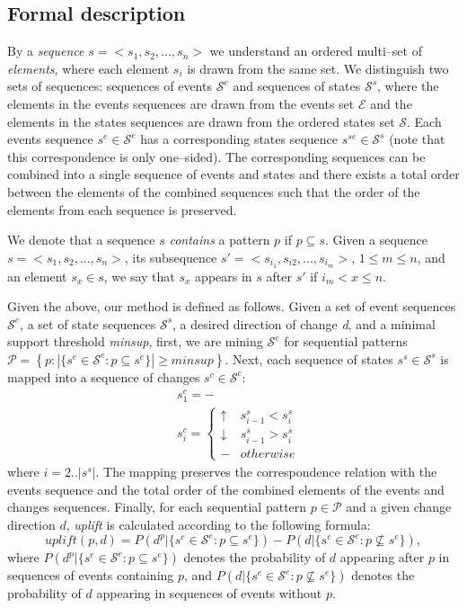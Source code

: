\documentclass[runningheads,a4paper]{llncs}
\begin{document}
\subsection{Formal description}
By a \textit{sequence} $s=<s_1, s_2, ..., s_n>$ we understand an ordered multi--set of \textit{elements}, where each element $s_i$ is drawn from the same set.
We distinguish two sets of sequences: sequences of events $\mathcal{S}^e$ and sequences of states $\mathcal{S}^s$, where the elements in the events sequences are drawn from the events set $\mathcal{E}$ and the elements in the states sequences are drawn from the ordered states set $\mathcal{S}$.
Each events sequence $s^e\in\mathcal{S}^e$ has a corresponding states sequence $s^{se}\in\mathcal{S}^s$ (note that this correspondence is only one--sided).
The corresponding sequences can be combined into a single sequence of events and states and there exists a total order between the elements of the combined sequences such that the order of the elements from each sequence is preserved.

We denote that a sequence $s$ \textit{contains} a pattern $p$ if $p\subseteq s$.
Given a sequence $s=<s_1,s_2,...,s_n>$, its subsequence $s'=<s_{i_1}, s_{i2}, ..., s_{i_m}>$, $1\leq m\leq n$, and an element $s_x\in s$, we say that $s_x$ appears in $s$ after $s'$ if $i_m<x\leq n$.

Given the above, our method is defined as follows.
Given a set of event sequences $\mathcal{S}^e$, a set of state sequences $\mathcal{S}^s$, a desired direction of change \textit{d}, and a minimal support threshold \textit{minsup}, first, we are mining $\mathcal{S}^e$ for sequential patterns $\mathcal{P}=\left\{p:|\{s^e\in\mathcal{S}^e:p\subseteq s^e\}|\geq\textit{minsup}\right\}$.
Next, each sequence of states $s^s\in\mathcal{S}^s$ is mapped into a sequence of changes $s^c\in\mathcal{S}^c$:
\begin{equation*}
\begin{split}
&s^c_1=-\\
&s^c_i=\begin{cases}
	\uparrow & s^s_{i-1}<s^s_i \\
	\downarrow & s^s_{i-1}>s^s_i \\
	- & otherwise
\end{cases}
\end{split}
\end{equation*}
where $i=2..|s^s|$.
The mapping preserves the correspondence relation with the events sequence and the total order of the combined elements of the events and changes sequences.
Finally, for each sequential pattern $p\in\mathcal{P}$ and a given change direction $d$, \textit{uplift} is calculated according to the following formula:
\begin{equation*}
\textit{uplift}(p,d)=P(d^p|\{s^e\in\mathcal{S}^e:p\subseteq s^e\})-P(d|\{s^e\in\mathcal{S}^e:p\not\subseteq s^e\}),
\end{equation*}
where $P(d^p|\{s^e\in\mathcal{S}^e:p\subseteq s^e\})$ denotes the probability of $d$ appearing after $p$ in sequences of events containing $p$, and $P(d|\{s^e\in\mathcal{S}^e:p\not\subseteq s^e\})$ denotes the probability of $d$ appearing in sequences of events without $p$.
\end{document}
